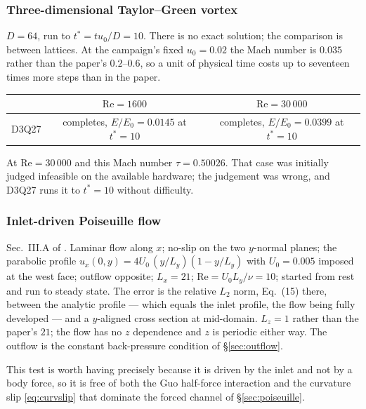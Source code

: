 \documentclass[11pt,a4paper]{article}
\begin{document}
\subsubsection{Three-dimensional Taylor--Green vortex}

$D=64$, run to $t^\ast = t u_0/D = 10$. There is no exact solution; the
comparison is between lattices. At the campaign's fixed $u_0=0.02$ the Mach
number is $0.035$ rather than the paper's $0.2$--$0.6$, so a unit of physical
time costs up to seventeen times more steps than in the paper.

\begin{center}\small
\begin{tabular}{lcc}
\toprule
 & $\mathrm{Re}=1600$ & $\mathrm{Re}=30\,000$ \\
\midrule
D3Q27 & completes, $E/E_0=0.0145$ at $t^\ast=10$ & completes, $E/E_0=0.0399$ at $t^\ast=10$ \\
\bottomrule
\end{tabular}
\end{center}

\noindent At $\mathrm{Re}=30\,000$ and this Mach number $\tau=0.50026$. That
case was initially judged infeasible on the available hardware; the judgement
was wrong, and D3Q27 runs it to $t^\ast=10$ without difficulty.

\subsubsection{Inlet-driven Poiseuille flow}
\label{sec:poisinlet}

Sec.~III.A of \cite{derosis2017pre}. Laminar flow along $x$; no-slip on the two
$y$-normal planes; the parabolic profile $u_x(0,y) = 4U_0\,(y/L_y)(1-y/L_y)$
with $U_0 = 0.005$ imposed at the west face; outflow opposite; $L_x = 21$;
$\mathrm{Re} = U_0 L_y/\nu = 10$; started from rest and run to steady state. The
error is the relative $L_2$ norm, Eq.~(15) there, between the analytic profile
--- which equals the inlet profile, the flow being fully developed --- and a
$y$-aligned cross section at mid-domain. $L_z=1$ rather than the paper's $21$;
the flow has no $z$ dependence and $z$ is periodic either way. The outflow is
the constant back-pressure condition of \S\ref{sec:outflow}.

This test is worth having precisely because it is driven by the inlet and not by
a body force, so it is free of both the Guo half-force interaction and the
curvature slip \eqref{eq:curvslip} that dominate the forced channel of
\S\ref{sec:poiseuille}.
\end{document}
